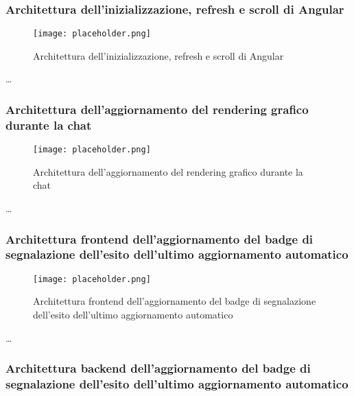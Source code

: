 \newpage


\subsubsection{Architettura dell’inizializzazione, refresh e scroll di Angular}
\label{sec:architettura_inizializzazione_angular}

\begin{figure}[h]
    \centering
    \texttt{[image: placeholder.png]}
    \caption{Architettura dell’inizializzazione, refresh e scroll di Angular}
\end{figure}

\dots

\newpage


\subsubsection{Architettura dell’aggiornamento del rendering grafico durante la chat}
\label{sec:architettura_aggiornamento_rendering_chat}

\begin{figure}[h]
    \centering
    \texttt{[image: placeholder.png]}
    \caption{Architettura dell’aggiornamento del rendering grafico durante la chat}
\end{figure}

\dots

\newpage


\subsubsection{Architettura frontend dell’aggiornamento del badge di segnalazione dell’esito dell’ultimo aggiornamento automatico}
\label{sec:architettura_frontend_badge_aggiornamento}

\begin{figure}[h]
    \centering
    \texttt{[image: placeholder.png]}
    \caption{Architettura frontend dell’aggiornamento del badge di segnalazione dell’esito dell’ultimo aggiornamento automatico}
\end{figure}

\dots

\newpage


\subsubsection{Architettura backend dell’aggiornamento del badge di segnalazione dell’esito dell’ultimo aggiornamento automatico}
\label{sec:architettura_backend_badge_aggiornamento}


